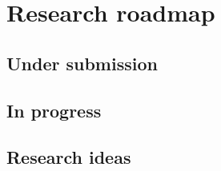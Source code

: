 \documentclass[./main]{subfiles}
\begin{document}
\section{Research roadmap}

\subsection{Under submission}

\subsection{In progress}

\subsection{Research ideas}
\end{document}
